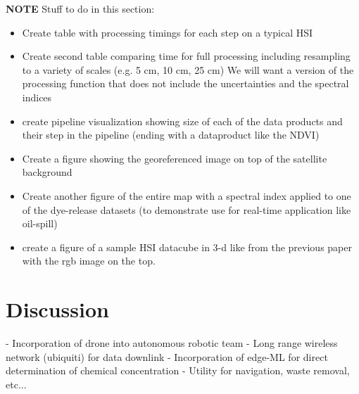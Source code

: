 



\textbf{NOTE} Stuff to do in this section:
\begin{itemize}
    \item  Create table with processing timings for each step on a typical HSI
    \item Create second table comparing time for full processing including resampling to a variety of scales (e.g. 5 cm, 10 cm, 25 cm) We will want a version of the processing function that does not include the uncertainties and the spectral indices
    \item create pipeline visualization showing size of each of the data products and their step in the pipeline (ending with a dataproduct like the NDVI)
    \item Create a figure showing the georeferenced image on top of the satellite background 
    \item Create another figure of the entire map with a spectral index applied to one of the dye-release datasets (to demonstrate use for real-time application like oil-spill)
    \item create a figure of a sample HSI datacube in 3-d like from the previous paper with the rgb image on the top. 
\end{itemize}



\section{Discussion}

- Incorporation of drone into autonomous robotic team
- Long range wireless network (ubiquiti) for data downlink
- Incorporation of edge-ML for direct determination of chemical concentration
- Utility for navigation, waste removal, etc...

